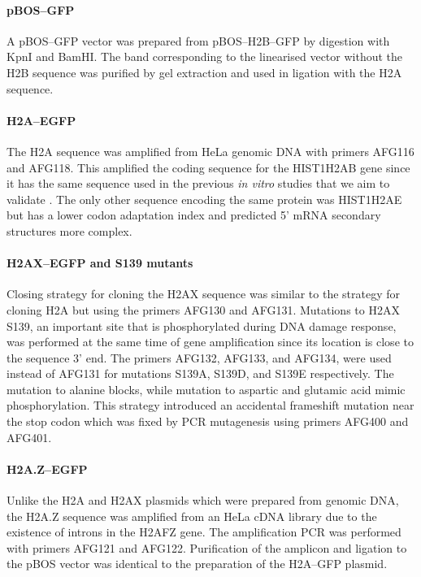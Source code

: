     \paragraph{pBOS--GFP}
      A pBOS--GFP vector was prepared from pBOS--H2B--GFP by digestion
      with KpnI and BamHI. The band corresponding to the linearised vector
      without the H2B sequence was purified by gel extraction and used in
      ligation with the H2A sequence.

    \paragraph{H2A--EGFP}
      The H2A sequence was amplified from HeLa genomic DNA with primers
      AFG116 and AFG118. This amplified the coding sequence for the
      HIST1H2AB gene since it has the same sequence used in the previous
      \textit{in vitro} studies that we aim to validate \citep{flaus2004sin}.
      The only other sequence encoding the same protein was HIST1H2AE but has
      a lower codon adaptation index and predicted 5' mRNA secondary
      structures more complex.

    \paragraph{H2AX--EGFP and S139 mutants}
      Closing strategy for cloning the H2AX sequence was similar to the
      strategy for cloning H2A but using the primers AFG130 and AFG131.
      Mutations to H2AX S139, an important site that is phosphorylated during
      DNA damage response,
      was performed at the same time of gene amplification since its location
      is close to the sequence 3' end. The primers AFG132, AFG133, and AFG134,
      were used instead of AFG131 for mutations S139A, S139D, and S139E
      respectively. The mutation to alanine blocks, while
      mutation to aspartic and glutamic acid mimic phosphorylation.
      This strategy introduced an accidental frameshift mutation near the
      stop codon which was fixed by PCR mutagenesis using primers AFG400
      and AFG401.

    \paragraph{H2A.Z--EGFP}
      Unlike the H2A and H2AX plasmids which were prepared from genomic DNA,
      the H2A.Z sequence was amplified from an HeLa cDNA library due
      to the existence of introns in the H2AFZ gene. The amplification PCR
      was performed with primers AFG121 and AFG122. Purification of the
      amplicon and ligation to the pBOS vector was identical to the preparation
      of the H2A--GFP plasmid.


